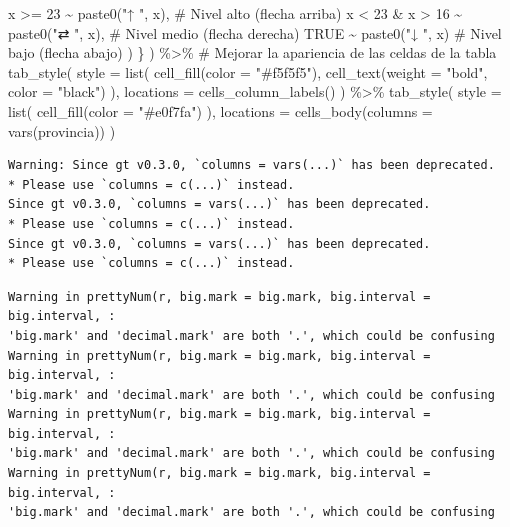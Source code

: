 \documentclass[
  letterpaper,
  DIV=11,
  numbers=noendperiod]{scrreprt}
\newenvironment{Shaded}{\begin{snugshade}}{\end{snugshade}}
\newcommand{\AttributeTok}[1]{\textcolor[rgb]{0.40,0.45,0.13}{#1}}
\newcommand{\CommentTok}[1]{\textcolor[rgb]{0.37,0.37,0.37}{#1}}
\newcommand{\ConstantTok}[1]{\textcolor[rgb]{0.56,0.35,0.01}{#1}}
\newcommand{\DecValTok}[1]{\textcolor[rgb]{0.68,0.00,0.00}{#1}}
\newcommand{\FunctionTok}[1]{\textcolor[rgb]{0.28,0.35,0.67}{#1}}
\newcommand{\NormalTok}[1]{\textcolor[rgb]{0.00,0.23,0.31}{#1}}
\newcommand{\SpecialCharTok}[1]{\textcolor[rgb]{0.37,0.37,0.37}{#1}}
\newcommand{\StringTok}[1]{\textcolor[rgb]{0.13,0.47,0.30}{#1}}
\begin{document}
\begin{Shaded}
\begin{Highlighting}[]
\NormalTok{                x }\SpecialCharTok{\textgreater{}=} \DecValTok{23} \SpecialCharTok{\textasciitilde{}} \FunctionTok{paste0}\NormalTok{(}\StringTok{"↑ "}\NormalTok{, x),  }\CommentTok{\# Nivel alto (flecha arriba)}
\NormalTok{                x }\SpecialCharTok{\textless{}} \DecValTok{23} \SpecialCharTok{\&}\NormalTok{ x }\SpecialCharTok{\textgreater{}} \DecValTok{16} \SpecialCharTok{\textasciitilde{}} \FunctionTok{paste0}\NormalTok{(}\StringTok{"⇄ "}\NormalTok{, x),  }\CommentTok{\# Nivel medio (flecha derecha)}
                \ConstantTok{TRUE} \SpecialCharTok{\textasciitilde{}} \FunctionTok{paste0}\NormalTok{(}\StringTok{"↓ "}\NormalTok{, x)  }\CommentTok{\# Nivel bajo (flecha abajo)}
\NormalTok{            )}
\NormalTok{        \}}
\NormalTok{    ) }\SpecialCharTok{\%\textgreater{}\%}
    \CommentTok{\# Mejorar la apariencia de las celdas de la tabla}
    \FunctionTok{tab\_style}\NormalTok{(}
        \AttributeTok{style =} \FunctionTok{list}\NormalTok{(}
            \FunctionTok{cell\_fill}\NormalTok{(}\AttributeTok{color =} \StringTok{"\#f5f5f5"}\NormalTok{),}
            \FunctionTok{cell\_text}\NormalTok{(}\AttributeTok{weight =} \StringTok{"bold"}\NormalTok{, }\AttributeTok{color =} \StringTok{"black"}\NormalTok{)}
\NormalTok{        ),}
        \AttributeTok{locations =} \FunctionTok{cells\_column\_labels}\NormalTok{()}
\NormalTok{    ) }\SpecialCharTok{\%\textgreater{}\%}
    \FunctionTok{tab\_style}\NormalTok{(}
        \AttributeTok{style =} \FunctionTok{list}\NormalTok{(}
            \FunctionTok{cell\_fill}\NormalTok{(}\AttributeTok{color =} \StringTok{"\#e0f7fa"}\NormalTok{)}
\NormalTok{        ),}
        \AttributeTok{locations =} \FunctionTok{cells\_body}\NormalTok{(}\AttributeTok{columns =} \FunctionTok{vars}\NormalTok{(provincia))}
\NormalTok{    )}
\end{Highlighting}
\end{Shaded}

\begin{verbatim}
Warning: Since gt v0.3.0, `columns = vars(...)` has been deprecated.
* Please use `columns = c(...)` instead.
Since gt v0.3.0, `columns = vars(...)` has been deprecated.
* Please use `columns = c(...)` instead.
Since gt v0.3.0, `columns = vars(...)` has been deprecated.
* Please use `columns = c(...)` instead.
\end{verbatim}

\begin{verbatim}
Warning in prettyNum(r, big.mark = big.mark, big.interval = big.interval, :
'big.mark' and 'decimal.mark' are both '.', which could be confusing
Warning in prettyNum(r, big.mark = big.mark, big.interval = big.interval, :
'big.mark' and 'decimal.mark' are both '.', which could be confusing
Warning in prettyNum(r, big.mark = big.mark, big.interval = big.interval, :
'big.mark' and 'decimal.mark' are both '.', which could be confusing
Warning in prettyNum(r, big.mark = big.mark, big.interval = big.interval, :
'big.mark' and 'decimal.mark' are both '.', which could be confusing
\end{verbatim}
\end{document}

